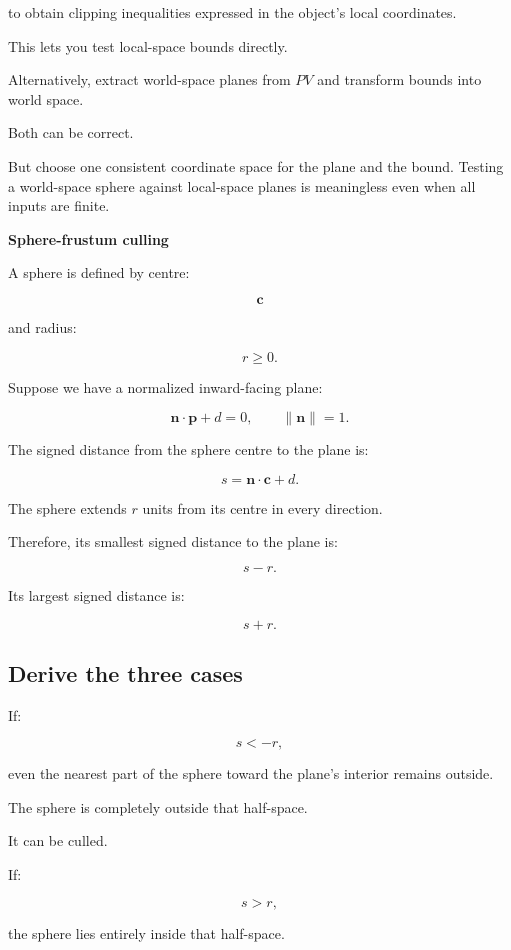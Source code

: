to obtain clipping inequalities expressed in the object's local coordinates.

This lets you test local-space bounds directly.

Alternatively, extract world-space planes from \(PV\) and transform bounds into world space.

Both can be correct.

But choose one consistent coordinate space for the plane and the bound. Testing a world-space sphere against local-space planes is meaningless even when all inputs are finite.

\textbf{Sphere-frustum culling}

A sphere is defined by centre:

\[
 \mathbf c
\]

and radius:

\[
 r\ge0.
\]

Suppose we have a normalized inward-facing plane:

\[
 \mathbf n\cdot\mathbf p+d=0, \qquad \|\mathbf n\|=1.
\]

The signed distance from the sphere centre to the plane is:

\[
 \boxed{ s=\mathbf n\cdot\mathbf c+d }.
\]

The sphere extends \(r\) units from its centre in every direction.

Therefore, its smallest signed distance to the plane is:

\[
 s-r.
\]

Its largest signed distance is:

\[
 s+r.
\]

\subsection{Derive the three cases}\label{02-foundations-ii-ch034-derive-the-three-cases}

\hypertarget{02-foundations-ii-ch034-derive-the-three-cases}{}

If:

\[
 \boxed{s<-r},
\]

even the nearest part of the sphere toward the plane's interior remains outside.

The sphere is completely outside that half-space.

It can be culled.

If:

\[
 \boxed{s>r},
\]

the sphere lies entirely inside that half-space.

